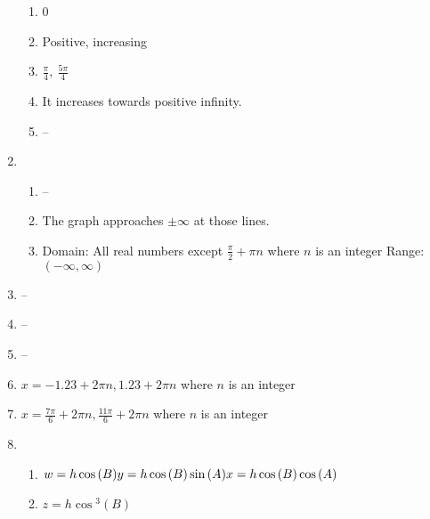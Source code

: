 \documentclass{article}
\begin{document}
\begin{enumerate}
	\begin{enumerate}
	
	\item 0
	
	\item Positive, increasing
	
	\item $\frac{\pi}{4}, \ \frac{5\pi}{4}$
	
	\item It increases towards positive infinity.
	
	\item --
	
	\end{enumerate}
	
\item

	\begin{enumerate}
	
	\item --
	
	\item The graph approaches $\pm \infty$ at those lines.
	
	\item Domain: All real numbers except $\frac{\pi}{2} + \pi n$ where $n$ is an integer \newline
		Range: $(-\infty, \infty)$
	
	\end{enumerate}

\item --

\item --

\item --
	
\item $x = -1.23 + 2\pi n, 1.23 + 2\pi n$ where $n$ is an integer

\item $x = \frac{7\pi}{6} + 2\pi n, \frac{11\pi}{6} + 2 \pi n$ where $n$ is an integer

\item 

	\begin{enumerate}
	
	\item	$w = h\cos{(B)} \newline
		y = h\cos{(B)}\sin{(A)} \newline
		x = h\cos{(B)}\cos{(A)}$
		
	\item $z = h\cos{^3(B)}$
	

\end{enumerate}
\end{enumerate}
\end{document}
